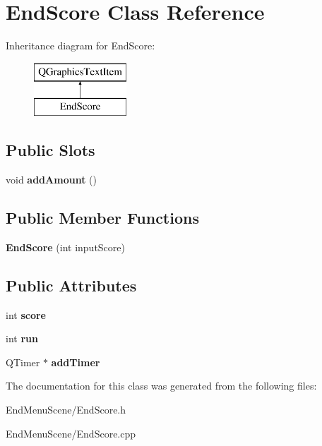 \hypertarget{classEndScore}{}\section{End\+Score Class Reference}
\label{classEndScore}
Inheritance diagram for End\+Score\+:\begin{figure}[H]
\begin{center}
\leavevmode
\includegraphics[height=2.000000cm]{classEndScore}
\end{center}
\end{figure}
\subsection*{Public Slots}
\begin{DoxyCompactItemize}
\item 
void {\bfseries add\+Amount} ()\hypertarget{classEndScore_aa7ceb6ad60b5a96265ac1343f21e2fa5}{}\label{classEndScore_aa7ceb6ad60b5a96265ac1343f21e2fa5}

\end{DoxyCompactItemize}
\subsection*{Public Member Functions}
\begin{DoxyCompactItemize}
\item 
{\bfseries End\+Score} (int input\+Score)\hypertarget{classEndScore_a5f7e9ff49366b9448242ba25b6dca5c2}{}\label{classEndScore_a5f7e9ff49366b9448242ba25b6dca5c2}

\end{DoxyCompactItemize}
\subsection*{Public Attributes}
\begin{DoxyCompactItemize}
\item 
int {\bfseries score}\hypertarget{classEndScore_abeb33879069b7d8352688b65af4c0382}{}\label{classEndScore_abeb33879069b7d8352688b65af4c0382}

\item 
int {\bfseries run}\hypertarget{classEndScore_a17bb38b597f93894e602d62851fc796c}{}\label{classEndScore_a17bb38b597f93894e602d62851fc796c}

\item 
Q\+Timer $\ast$ {\bfseries add\+Timer}\hypertarget{classEndScore_a88e820dfbf339eef4fe783661858bef1}{}\label{classEndScore_a88e820dfbf339eef4fe783661858bef1}

\end{DoxyCompactItemize}


The documentation for this class was generated from the following files\+:\begin{DoxyCompactItemize}
\item 
End\+Menu\+Scene/End\+Score.\+h\item 
End\+Menu\+Scene/End\+Score.\+cpp\end{DoxyCompactItemize}
